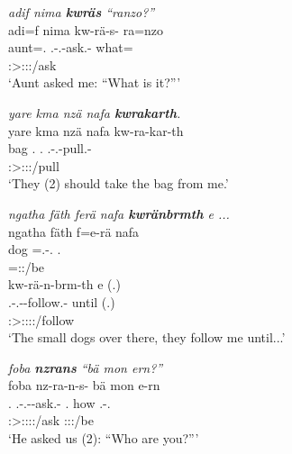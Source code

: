 \begin{exe}
	\ex \emph{adif nima \textbf{kwräs} ``ranzo?''}\\
	\glll adi=f nima kw-rä-s-\Zero{} ra=nzo\\
	aunt=\Erg.\Sg{} \Quot{} \Fsg.\Bet-\Irr.\Ndu-ask.\Rs-\Stsg{} what=\Only\\
	{} {} \footnotesize{\Stsg:\Sbj>\Fsg:\Obj:\Irr:\Pfv/ask} {}\\
	\trans `Aunt asked me: ``What is it?'''
	\label{ex243}
\end{exe}
\begin{exe}
	\ex \emph{yare kma nzä nafa \textbf{kwrakarth}.}\\
	\glll yare kma nzä nafa kw-ra-kar-th\\
	bag \Pot{} \Fsg.\Abs{} \Tnsg.\Erg{} \Fsg.\Bet-\Irr.\Du-pull.\Rs-\Stnsg\\
	{} {} {} {} \footnotesize{\Stdu:\Sbj>\Fsg:\Obj:\Irr:\Pfv/pull}\\
	\trans `They (2) should take the bag from me.'
	\label{ex245}
\end{exe}
\begin{exe}
	\ex \emph{ngatha fäth ferä nafa \textbf{kwränbrmth} e ...}\\
	\glll ngatha fäth f=e-rä nafa\\
	dog \Dim{} \Dist=\Stnsg.\Alph-\Cop.\Ndu{} \Tnsg.\Erg{}\\
	{} {} \footnotesize{\Dist=\Stpl:\Sbj:\Nonpast/be} {}\\
	\sn
	\glll kw-rä-n-brm-th e (.)\\
	\Fsg{}.\Bet{}-\Irr.\Ndu-\Venit-follow.\Rs-\Stnsg{} until (.)\\
	\footnotesize{\Stpl:\Sbj>\Fsg:\Obj:\Irr:\Pfv:\Venit/follow} {} {}\\
	\trans `The small dogs over there, they follow me until...'
	\label{ex246}
\end{exe}
\begin{exe}
	\ex \emph{foba \textbf{nzrans} ``bä mon ern?''}\\
	\glll foba nz-ra-n-s-\Zero{} bä mon e-rn\\
	\Dist.\Abl{} \Fnsg.\Bet-\Irr.\Du-\Venit-ask.\Rs-\Stsg{} \Second.\Abs{} how \Stnsg.\Alph-\Cop.\Du\\
	{} \footnotesize{\Stsg:\Sbj>\Fdu:\Obj:\Irr:\Pfv:\Venit/ask} {} {} \footnotesize{\Stdu:\Sbj:\Nonpast:\Ipfv/be}\\
	\trans `He asked us (2): ``Who are you?'''
	\label{ex248}
\end{exe}
